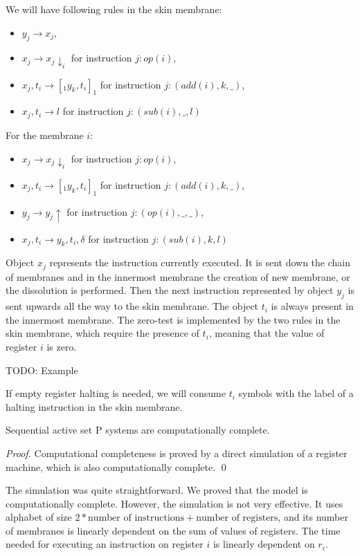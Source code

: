 \documentclass[llncs,submission,copyright,creativecommons]{../lib/lncs/llncs}
\begin{document}
We will have following rules in the skin membrane:
\begin{itemize}
  \item $y_j \rightarrow x_j$,
  \item $x_j \rightarrow x_j\downarrow_{i}$ for instruction $j: op(i)$,
  \item $x_j, t_i \rightarrow [_1 y_k, t_i ]_1$ for instruction $j: (add(i), k, \_)$,
  \item $x_j, t_i \rightarrow l$ for instruction $j: (sub(i), \_, l)$
\end{itemize}

For the membrane $i$:
\begin{itemize}
  \item $x_j \rightarrow x_j\downarrow_{i}$ for instruction $j: op(i)$,
  \item $x_j, t_i \rightarrow [_1 y_k, t_i ]_1$ for instruction $j: (add(i), k, \_)$,
  \item $y_j \rightarrow y_j\uparrow$ for instruction $j: (op(i), \_, \_)$,
  \item $x_j, t_i \rightarrow y_k, t_i, \delta$ for instruction $j: (sub(i), k, l)$
\end{itemize}

Object $x_j$ represents the instruction currently executed. It is sent down the chain of membranes and in the innermost membrane the creation of new membrane, or the dissolution is performed. Then the next instruction represented by object $y_j$ is sent upwards all the way to the skin membrane. The object $t_i$ is always present in the innermost membrane. The zero-test is implemented by the two rules in the skin membrane, which require the presence of $t_i$, meaning that the value of register $i$ is zero.

TODO: Example

If empty register halting is needed, we will consume $t_i$ symbols with the label of a halting instruction in the skin membrane.

\begin{theorem}
  Sequential active set P systems are computationally complete.
\end{theorem}

\begin{proof}
  Computational completeness is proved by a direct simulation of a register machine, which is also computationally complete. \qed
\end{proof}

The simulation was quite straightforward. We proved that the model is computationally complete. However, the simulation is not very effective. It uses alphabet of size $2 * \text{number of instructions} + \text{number of registers}$, and its number of membranes is linearly dependent on the sum of values of registers. The time needed for executing an instruction on register $i$ is linearly dependent on $r_i$.
\end{document}

